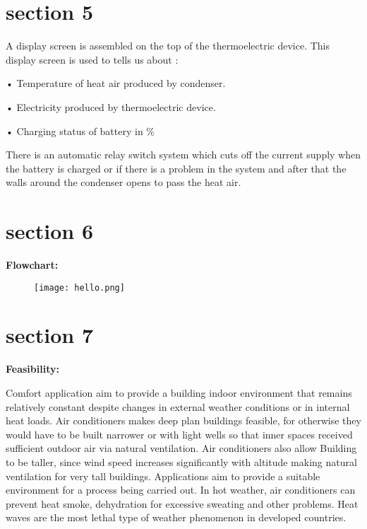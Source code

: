\documentclass[12pt]{beamer}
\begin{document}
\section{section 5}
\begin{frame}


A display screen is assembled on the top of the thermoelectric device. This display screen is used to tells us about : 

•	Temperature of heat air produced by condenser. 

•	Electricity produced by thermoelectric device. 

•	Charging status of battery in \%
 
There is an automatic relay switch system which cuts off the current supply when the battery is charged or if there is a problem in the system and after that the walls around the condenser opens to pass the heat air. 

\end{frame}

\section{section 6}
\begin{frame}

\textbf{Flowchart:         }


\begin{figure} 
\centering
\texttt{[image: hello.png]} 
\end{figure}

\end{frame}

\section{section 7}
\begin{frame}
\textbf{Feasibility:         }

Comfort application aim to provide a building indoor environment that remains relatively constant despite changes in external weather conditions or in internal heat loads. Air  conditioners makes deep plan buildings feasible, for otherwise they would have to be built narrower or with light wells so that inner spaces received sufficient outdoor air via natural ventilation. Air conditioners also allow Building to be taller, since wind speed increases significantly with altitude making natural ventilation for very tall buildings. Applications aim to provide a suitable environment for a process being carried out. In hot weather,  air conditioners can prevent heat smoke, dehydration for excessive sweating and other problems. Heat waves are the most lethal type of weather phenomenon in developed countries. 


\end{frame}
\end{document}

